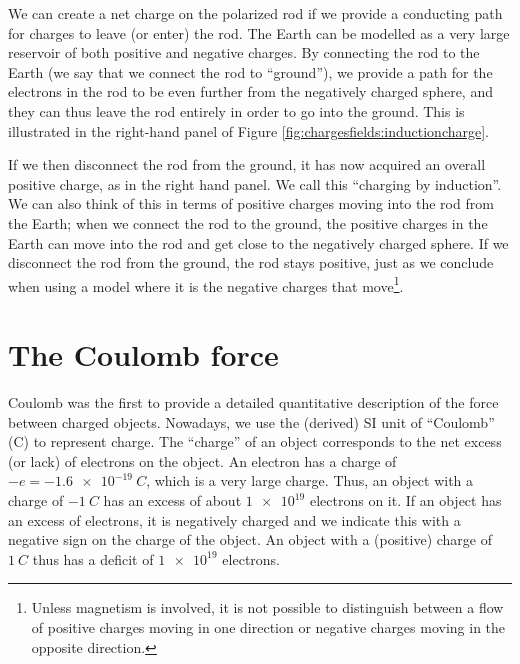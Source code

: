 We can create a net charge on the polarized rod if we provide a conducting path for charges to leave (or enter) the rod. The Earth can be modelled as a very large reservoir of both positive and negative charges. By connecting the rod to the Earth (we say that we connect the rod to ``ground''), we provide a path for the electrons in the rod to be even further from the negatively charged sphere, and they can thus leave the rod entirely in order to go into the ground. This is illustrated in the right-hand panel of Figure \ref{fig:chargesfields:inductioncharge}.

If we then disconnect the rod from the ground, it has now acquired an overall positive charge, as in the right hand panel. We call this ``charging by induction''. We can also think of this in terms of positive charges moving into the rod from the Earth; when we connect the rod to the ground, the positive charges in the Earth can move into the rod and get close to the negatively charged sphere. If we disconnect the rod from the ground, the rod stays positive, just as we conclude when using a model where it is the negative charges that move\footnote{Unless magnetism is involved, it is not possible to distinguish between a flow of positive charges moving in one direction or negative charges moving in the opposite direction.}.


\section{The Coulomb force}
Coulomb was the first to provide a detailed quantitative description of the force between charged objects. Nowadays, we use the (derived) SI unit of ``Coulomb'' (C) to represent charge. The ``charge'' of an object corresponds to the net excess (or lack) of electrons on the object. An electron has a charge of $-e=\SI{-1.6e-19}{C}$, which is a very large charge. Thus, an object with a charge of $\SI{-1}{C}$ has an excess of about $\num{1e19}$ electrons on it. If an object has an excess of electrons, it is negatively charged and we indicate this with a negative sign on the charge of the object. An object with a (positive) charge of $\SI{1}{C}$ thus has a deficit of $\num{1e19}$ electrons.

